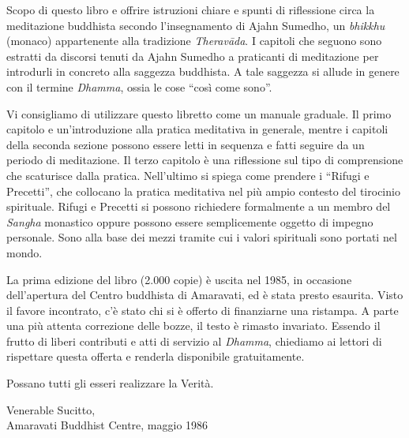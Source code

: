 
\vspace*{0.3\onelineskip}
Scopo di questo libro e offrire istruzioni chiare e spunti di
riflessione circa la meditazione buddhista secondo l'insegnamento di
Ajahn Sumedho, un \textit{bhikkhu} (monaco) appartenente alla tradizione
\textit{Theravāda}. I capitoli che seguono sono estratti da discorsi
tenuti da Ajahn Sumedho a praticanti di meditazione per introdurli in
concreto alla saggezza buddhista. A tale saggezza si allude in genere
con il termine \textit{Dhamma}, ossia le cose ``così come sono''.

Vi consigliamo di utilizzare questo libretto come un manuale graduale.
Il primo capitolo e un'introduzione alla pratica meditativa in generale,
mentre i capitoli della seconda sezione possono essere letti in sequenza
e fatti seguire da un periodo di meditazione. Il terzo capitolo è una
riflessione sul tipo di comprensione che scaturisce dalla pratica.
Nell'ultimo si spiega come prendere i ``Rifugi e Precetti'', che collocano
la pratica meditativa nel più ampio contesto del tirocinio spirituale.
Rifugi e Precetti si possono richiedere formalmente a un membro del
\textit{Sangha} monastico oppure possono essere semplicemente oggetto di impegno
personale. Sono alla base dei mezzi tramite cui i valori spirituali sono
portati nel mondo.

La prima edizione del libro (2.000 copie) è uscita nel 1985, in
occasione dell'apertura del Centro buddhista di Amaravati, ed è stata
presto esaurita. Visto il favore incontrato, c'è stato chi si è offerto
di finanziarne una ristampa. A parte una più attenta correzione delle
bozze, il testo è rimasto invariato. Essendo il frutto di liberi
contributi e atti di servizio al \textit{Dhamma}, chiediamo ai lettori di
rispettare questa offerta e renderla disponibile gratuitamente.

Possano tutti gli esseri realizzare la Verità.

\bigskip
{\par\raggedleft
Venerable Sucitto,\\
Amaravati Buddhist Centre, maggio 1986\\
\par}

